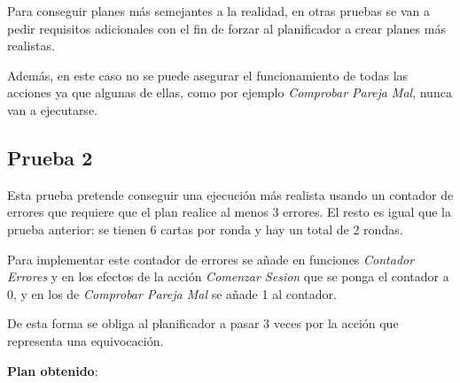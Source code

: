 \documentclass{uc3mpracticas}
\begin{document}
  \vspace{2mm}

  Para conseguir planes más semejantes a la realidad, en otras pruebas se van a pedir requisitos adicionales con el fin de forzar al planificador a crear planes más realistas.

  \vspace{2mm}

  Además, en este caso no se puede asegurar el funcionamiento de todas las acciones ya que algunas de ellas, como por ejemplo \textit{Comprobar Pareja Mal}, nunca van a ejecutarse.



  \subsection{Prueba 2}

  Esta prueba pretende conseguir una ejecución más realista usando un contador de errores que requiere que el plan realice al menos 3 errores. El resto es igual que la prueba anterior: se tienen 6 cartas por ronda y hay un total de 2 rondas.

  \vspace{2mm}

  Para implementar este contador de errores se añade en funciones \textit{Contador Errores} y en los efectos de la acción \textit{Comenzar Sesion} que se ponga el contador a 0, y en los de \textit{Comprobar Pareja Mal} se añade 1 al contador.

  \vspace{2mm}

  De esta forma se obliga al planificador a pasar 3 veces por la acción que representa una equivocación.

    \vspace{3mm}

    \textbf{Plan obtenido}:
\end{document}
